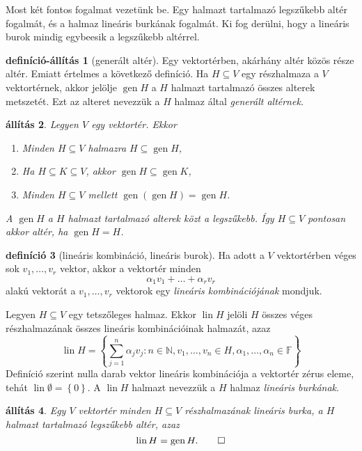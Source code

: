 \documentclass[9pt, showtrims]{memoir}
\theoremstyle{plain}
\newtheorem{proposition}{állítás}[section]
\theoremstyle{remark}
\theoremstyle{definition}
\newtheorem{definition}[proposition]{definíció}
\newtheorem{defprop}[proposition]{definíció-állítás}
\renewcommand{\mathbf}{\mathbb}
\DeclareMathOperator{\lin}{lin}
\DeclareMathOperator{\gen}{gen}
\begin{document}
Most két fontos fogalmat vezetünk be.
Egy halmazt tartalmazó legszűkebb altér fogalmát,
és a halmaz lineáris burkának fogalmát. 
Ki fog derülni, hogy a lineáris burok mindig egybeesik a legszűkebb altérrel.
\begin{defprop}[generált altér]
    Egy vektortérben, akárhány altér közös része altér.
    Emiatt értelmes a következő definíció.
    Ha $H\subseteq V$ egy részhalmaza a $V$ vektortérnek,
    akkor jelölje 
    $\gen H$ a $H$ halmazt tartalmazó összes alterek metszetét.
    Ezt az alteret nevezzük a $H$ halmaz által \emph{generált altérnek.}
\end{defprop}
\begin{proposition}
    Legyen $V$ egy vektortér.
    Ekkor
    \begin{enumerate}
        \item Minden $H\subseteq V$ halmazra $H\subseteq \gen H$,
        \item Ha $H\subseteq K\subseteq V$, akkor $\gen H\subseteq \gen K$,
        \item Minden $H\subseteq V$ mellett $\gen\left( \gen H \right)=\gen H$.
    \end{enumerate}
    A $\gen H$ a $H$ halmazt tartalmazó alterek közt a legszűkebb.
    Így $H\subseteq V$ pontosan akkor altér, ha $\gen H=H$.
\end{proposition}
\begin{definition}[lineáris kombináció, lineáris burok]
    Ha adott a $V$ vektortérben véges sok $v_1,\dots,v_r$ vektor,
    akkor a vektortér minden
    \[
        \alpha_1v_1+\dots+\alpha_r v_r
    \]
    alakú vektorát a $v_1,\dots,v_r$ vektorok egy \emph{lineáris kombinációjának} mondjuk.

    Legyen $H\subseteq V$ egy tetszőleges halmaz.
    Ekkor $\lin H$ jelöli $H$ összes véges részhalmazának összes lineáris kombinációinak halmazát,
    azaz
    \[
        \lin H=
        \left\{ \sum_{j=1}^n\alpha_jv_j:n\in\mathbf{N},v_1,\dots,v_n\in H,\alpha_1,\dots,\alpha_n\in\mathbf{F} \right\}
    \]
    Definíció szerint nulla darab vektor lineáris kombinációja a vektortér zérus eleme, 
    tehát $\lin \emptyset=\left\{ 0 \right\}.$
    A $\lin H$ halmazt nevezzük a $H$ halmaz \emph{lineáris burkának}.
\end{definition}
\begin{proposition}
    Egy $V$ vektortér minden $H\subseteq V$ részhalmazának lineáris burka, 
    a $H$ halmazt tartalmazó legszűkebb altér, azaz
    \[
        \lin H=\gen H.\qedhere
    \]
\end{proposition}
\end{document}
